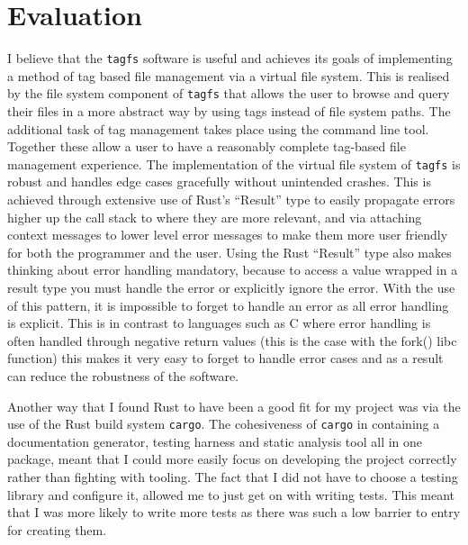 \chapter{Evaluation}
\vspace{1cm}

I believe that the \texttt{tagfs} software is useful and achieves its goals of
implementing a method of tag based file management via a virtual file system.
This is realised by the file system component of \texttt{tagfs} that allows the
user to browse and query their files in a more abstract way by using tags
instead of file system paths. The additional task of tag management takes place
using the command line tool. Together these allow a user to have a reasonably
complete tag-based file management experience. The implementation of the
virtual file system of \texttt{tagfs} is robust and handles edge cases
gracefully without unintended crashes. This is achieved through extensive use
of Rust's ``Result'' type to easily propagate errors higher up the call stack
to where they are more relevant, and via attaching context messages to lower
level error messages to make them more user friendly for both the programmer
and the user. Using the Rust ``Result'' type also makes thinking about error
handling mandatory, because to access a value wrapped in a result type you must
handle the error or explicitly ignore the error. With the use of this pattern,
it is impossible to forget to handle an error as all error handling is
explicit. This is in contrast to languages such as C where error handling is
often handled through negative return values (this is the case with the fork()
libc function) this makes it very easy to forget to handle error cases and as a
result can reduce the robustness of the software.

Another way that I found Rust to have been a good fit for my project was via
the use of the Rust build system \texttt{cargo}. The cohesiveness of
\texttt{cargo} in containing a documentation generator, testing harness and
static analysis tool all in one package, meant that I could more easily focus
on developing the project correctly rather than fighting with tooling. The fact
that I did not have to choose a testing library and configure it, allowed me to
just get on with writing tests. This meant that I was more likely to write more
tests as there was such a low barrier to entry for creating them.

